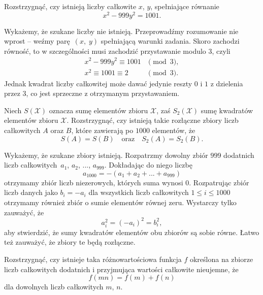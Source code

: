 \newpage
{}

\begin{problem}{1}
	Rozstrzygnąć, czy istnieją liczby całkowite $x$, $y$, spełniające równanie
	\[
		x^2 - 999y^2 = 1001.
	\]
\end{problem}

\noindent
Wykażemy, że szukane liczby nie istnieją. Przeprowadźmy rozumowanie nie wprost -- weźmy parę~$(x,\; y)$ spełniającą warunki zadania. Skoro zachodzi równość, to w szczególności musi zachodzić przystawanie modulo 3, czyli
\begin{align*}
	x^2 - 999y^2 \equiv 1001 &\pmod{3}, \\
	x^2 \equiv 1001 \equiv 2 &\pmod{3}.
\end{align*}
Jednak kwadrat liczby całkowitej może dawać jedynie reszty $0$ i $1$ z dzielenia przez $3$, co jest sprzeczne z otrzymanym przystawaniem.

\vspace{5px}

\begin{problem}{2}
	Niech $S(\mathcal{X})$ oznacza sumę elementów zbioru $\mathcal{X}$, zaś $S_2(\mathcal{X})$ sumę kwadratów elementów zbioru $\mathcal{X}$. Rozstrzygnąć, czy istnieją takie rozłączne zbiory liczb całkowitych $A$ oraz $B$, które zawierają po $1000$ elementów, że
	\[
		S(A) = S(B) \quad \text{oraz} \quad S_2(A) = S_2(B).
	\]
\end{problem}

\noindent
Wykażemy, że szukane zbiory istnieją.
Rozpatrzmy dowolny zbiór $999$ dodatnich liczb całkowitych~$a_1$, $a_2$, ..., $a_{999}$. Dokładając do niego liczbę
\[
	a_{1000} = - (a_1 + a_2 + ... + a_{999}) 
\]
otrzymamy zbiór liczb niezerowych, których suma wynosi $0$. Rozpatrując zbiór liczb danych jako $b_i = -a_i$ dla wszystkich liczb całkowitych $1 \leqslant i \leqslant 1000$ otrzymamy również zbiór o sumie elementów równej zeru. Wystarczy tylko zauważyć, że
\[
	a_i^2 = (-a_i)^2 = b_i^2,
\]
aby stwierdzić, że sumy kwadratów elementów obu zbiorów są sobie równe. Łatwo też zauważyć, że zbiory te będą rozłączne.

\begin{problem}{3}
	Rozstrzygnąć, czy istnieje taka różnowartościowa funkcja $f$ określona na zbiorze liczb całkowitych dodatnich i przyjmująca wartości całkowite nieujemne, że
	\[
		f(mn) = f(m) + f(n)
	\]
	dla dowolnych liczb całkowitych $m$, $n$.
\end{problem}

